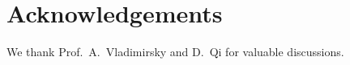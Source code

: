 \documentclass[eikonal.tex]{subfiles}
\begin{document}
\section{Acknowledgements}

We thank Prof.\ A.\ Vladimirsky and D.\ Qi for valuable
discussions.
\end{document}
